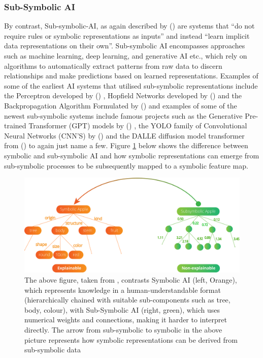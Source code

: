 \documentclass[journal]{IEEEtran}
\newcommand{\citeauthornum}[1]{\citeauthor{#1} (\citeyear{#1}) \cite{#1}}
\begin{document}
\subsubsection{\textbf{Sub-Symbolic AI}}
By contrast, Sub-symbolic-AI, as again described by \citeauthornum{Dingli2023} are systems that \enquote{do not require rules or symbolic representations as inputs} and instead \enquote{learn implicit data representations on their own}. Sub-symbolic AI encompasses approaches such as machine learning, deep learning, and generative AI etc., which rely on algorithms to automatically extract patterns from raw data to discern relationships and make predictions based on learned representations. Examples of some of the earliest AI systems that utilised sub-symbolic representations include the Perceptron developed by \citeauthornum{Rosenblatt1958}, Hopfield Networks developed by \citeauthornum{Hopfield1982} and the Backpropagation Algorithm Formulated by \citeauthornum{Rumelhart1986} and examples of some of the newest sub-symbolic systems include famous projects such as the Generative Pre-trained Transformer (GPT) models by \citeauthornum{Vaswani2017}, the YOLO family of Convolutional Neural Networks (CNN'S) by \citeauthornum{Redmon2015} and the DALLE diffusion model transformer from \citeauthornum{Ramesh2021} to again just name a few. Figure \ref{fig:sub-and-symbolic-AI} below shows the difference between symbolic and sub-symbolic AI and how symbolic representations can emerge from sub-symbolic processes to be subsequently mapped to a symbolic feature map. 

\begin{figure}[ht]
    \centering
    \includegraphics[width=\textwidth/2]{Figures/Symbolic_VS_SubSymbollic_AI.png}
    \caption{The above figure, taken from \cite{Yalcin2021},  contrasts Symbolic AI (left, Orange), which represents knowledge in a human-understandable format (hierarchically chained with suitable sub-components such as tree, body, colour), with Sub-Symbolic AI (right, green), which uses numerical weights and connections, making it harder to interpret directly. The arrow from sub-symbolic to symbolic in the above picture represents how symbolic representations can be derived from sub-symbolic data}
    \label{fig:sub-and-symbolic-AI}
\end{figure}
\end{document}
